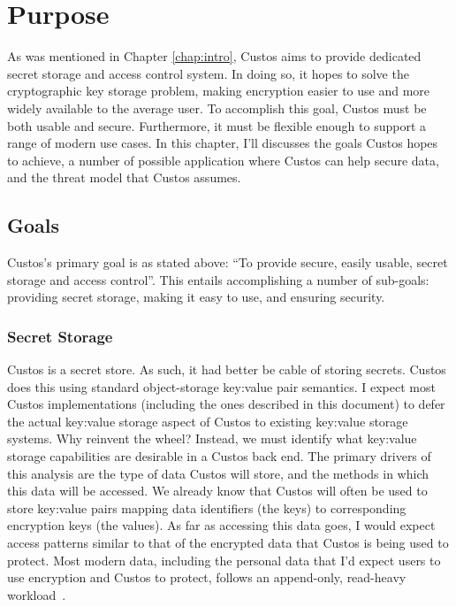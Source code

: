 \chapter{Purpose}
\label{chap:purpose}

As was mentioned in Chapter \ref{chap:intro}, Custos aims to provide
dedicated secret storage and access control system. In doing so, it
hopes to solve the cryptographic key storage problem, making
encryption easier to use and more widely available to the average
user. To accomplish this goal, Custos must be both usable and secure.
Furthermore, it must be flexible enough to support a range of modern
use cases. In this chapter, I'll discusses the goals Custos hopes to
achieve, a number of possible application where Custos can help secure
data, and the threat model that Custos assumes.

\section{Goals}

Custos's primary goal is as stated above: ``To provide secure, easily
usable, secret storage and access control''. This entails
accomplishing a number of sub-goals: providing secret storage, making
it easy to use, and ensuring security.

\subsection{Secret Storage}

Custos is a secret store. As such, it had better be cable of storing
secrets. Custos does this using standard object-storage key:value pair
semantics. I expect most Custos implementations (including the ones
described in this document) to defer the actual key:value storage
aspect of Custos to existing key:value storage systems. Why reinvent
the wheel? Instead, we must identify what key:value storage
capabilities are desirable in a Custos back end. The primary drivers
of this analysis are the type of data Custos will store, and the
methods in which this data will be accessed. We already know that
Custos will often be used to store key:value pairs mapping data
identifiers (the keys) to corresponding encryption keys (the
values). As far as accessing this data goes, I would expect access
patterns similar to that of the encrypted data that Custos is being
used to protect. Most modern data, including the personal data that
I'd expect users to use encryption and Custos to protect, follows an
append-only, read-heavy workload~\cite{Ghemawat2003}.

